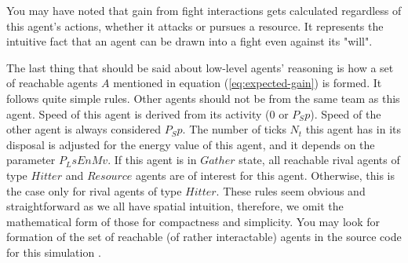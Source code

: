 You may have noted that gain from fight interactions gets calculated regardless of this agent's actions, whether it
attacks or pursues a resource. It represents the intuitive fact that an agent can be drawn into a fight even against its
"will".

The last thing that should be said about low-level agents' reasoning is how a set of reachable agents $A$ mentioned in
equation (\ref{eq:expected-gain}) is formed. It follows quite simple rules. Other agents should not be from the same
team as this agent. Speed of this agent is derived from its activity ($0$ or $P_Sp$). Speed of the other agent is always
considered $P_Sp$. The number of ticks $N_t$ this agent has in its disposal is adjusted for the energy value of this
agent, and it depends on the parameter $P_LsEnMv$. If this agent is in $Gather$ state, all reachable rival agents of
type $Hitter$ and $Resource$ agents are of interest for this agent. Otherwise, this is the case only for rival agents of
type $Hitter$. These rules seem obvious and straightforward as we all have spatial intuition, therefore, we omit the
mathematical form of those for compactness and simplicity. You may look for formation of the set of reachable (of rather
interactable) agents in the source code for this simulation \cite{github}.
